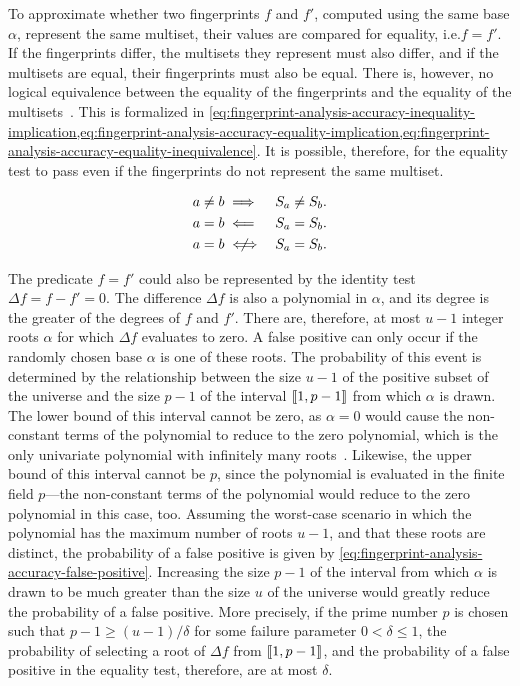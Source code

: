To approximate whether two fingerprints \( f \) and \( f' \), computed using the same base \( \alpha \), represent the same multiset, their values are compared for equality, i.e.\@ \( f = f' \).
If the fingerprints differ, the multisets they represent must also differ, and if the multisets are equal, their fingerprints must also be equal.
There is, however, no logical equivalence between the equality of the fingerprints and the equality of the multisets~\citep{karp87}.
This is formalized in \cref{eq:fingerprint-analysis-accuracy-inequality-implication,eq:fingerprint-analysis-accuracy-equality-implication,eq:fingerprint-analysis-accuracy-equality-inequivalence}.
It is possible, therefore, for the equality test to pass even if the fingerprints do not represent the same multiset.

\begin{alignat}{2}
  \label{eq:fingerprint-analysis-accuracy-inequality-implication}
  a \neq b &\implies & &S_{a} \neq S_{b}. \\
  \label{eq:fingerprint-analysis-accuracy-equality-implication}
  a = b &\impliedby & &S_{a} = S_{b}. \\
  \label{eq:fingerprint-analysis-accuracy-equality-inequivalence}
  a = b &\niff & &S_{a} = S_{b}.
\end{alignat}

The predicate \( f = f' \) could also be represented by the identity test \( \Delta f = f - f' = 0 \).
The difference \( \Delta f \) is also a polynomial in \( \alpha \), and its degree is the greater of the degrees of \( f \) and \( f' \).
There are, therefore, at most \( u - 1 \) integer roots \( \alpha \) for which \( \Delta f \) evaluates to zero.
A false positive can only occur if the randomly chosen base \( \alpha \) is one of these roots.
The probability of this event is determined by the relationship between the size \( u - 1 \) of the positive subset of the universe and the size \( p - 1 \) of the interval \( \llbracket1, p - 1\rrbracket \) from which \( \alpha \) is drawn.
The lower bound of this interval cannot be zero, as \( \alpha = 0 \) would cause the non-constant terms of the polynomial to reduce to the zero polynomial, which is the only univariate polynomial with infinitely many roots~\citep{graham94}.
Likewise, the upper bound of this interval cannot be \( p \), since the polynomial is evaluated in the finite field \( p \)---the non-constant terms of the polynomial would reduce to the zero polynomial in this case, too.
Assuming the worst-case scenario in which the polynomial has the maximum number of roots \( u - 1 \), and that these roots are distinct, the probability of a false positive is given by \cref{eq:fingerprint-analysis-accuracy-false-positive}.
Increasing the size \( p - 1 \) of the interval from which \( \alpha \) is drawn to be much greater than the size \( u \) of the universe would greatly reduce the probability of a false positive.
More precisely, if the prime number \( p \) is chosen such that \( p - 1 \geq (u - 1) / \delta \) for some failure parameter \( 0 < \delta \leq 1 \), the probability of selecting a root of \( \Delta f \) from \( \llbracket1, p - 1\rrbracket \), and the probability of a false positive in the equality test, therefore, are at most \( \delta \).

